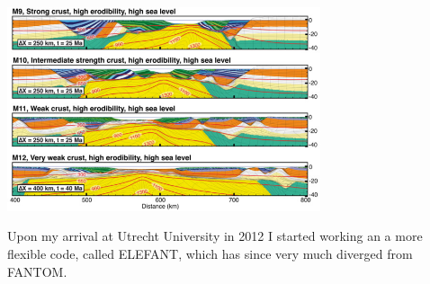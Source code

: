 \begin{itemize}
\begin{center}
\includegraphics[height=6cm]{images/mycodes/thhu19_img}
\end{center}



\end{itemize}

Upon my arrival at Utrecht University in 2012 I started working an a more flexible code, called ELEFANT, which has since very much 
diverged from FANTOM.

